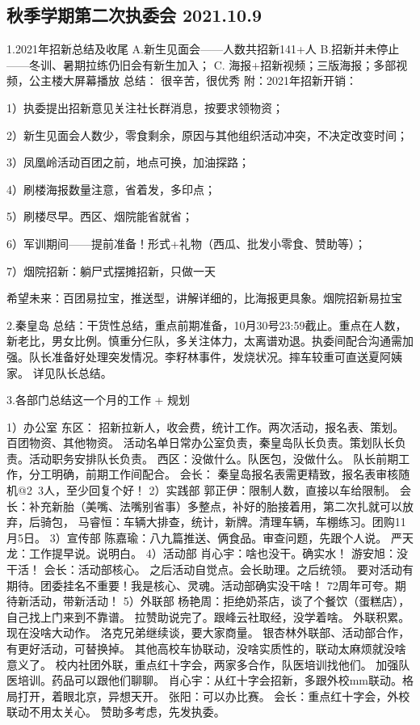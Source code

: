 \documentclass{ctexbook}
\begin{document}
\subsection{秋季学期第二次执委会 2021.10.9}
1.2021年招新总结及收尾 A.新生见面会——人数共招新141+人 B.招新并未停止——冬训、暑期拉练仍旧会有新生加入； C. 海报+招新视频；三版海报；多部视频，公主楼大屏幕播放 总结： 很辛苦，很优秀 附：2021年招新开销： 

1）执委提出招新意见关注社长群消息，按要求领物资；

2）新生见面会人数少，零食剩余，原因与其他组织活动冲突，不决定改变时间；

3）凤凰岭活动百团之前，地点可换，加油探路；

4）刷楼海报数量注意，省着发，多印点；

5）刷楼尽早。西区、烟院能省就省；

6）军训期间——提前准备！形式+礼物（西瓜、批发小零食、赞助等）；

7）烟院招新：躺尸式摆摊招新，只做一天

希望未来：百团易拉宝，推送型，讲解详细的，比海报更具象。烟院招新易拉宝 

2.秦皇岛 总结：干货性总结，重点前期准备，10月30号23:59截止。重点在人数，新老比，男女比例。慎重分仨队，多关注体力，太离谱劝退。执委间配合沟通需加强。队长准备好处理突发情况。李籽林事件，发烧状况。摔车较重可直送夏阿姨家。 详见队长总结。

3.各部门总结这一个月的工作 + 规划 

1）办公室 东区： 招新拉新人，收会费，统计工作。两次活动，报名表、策划。百团物资、其他物资。
活动名单日常办公室负责，秦皇岛队长负责。策划队长负责。活动职务安排队长负责。 
西区：没做什么。队医包，没做什么。
队长前期工作，分工明确，前期工作间配合。 
会长： 秦皇岛报名表需更精致，报名表审核随机@2~3人，至少回复个好！ 
2）实践部 郭正伊：限制人数，直接以车给限制。 
会长：补充新胎（美嘴、法嘴别省事）多整点，补好的胎接着用，第二次扎就可以放弃，后骑包，
马睿恒：车辆大排查，统计，新牌。清理车辆，车棚练习。团购11月5日。 
3）宣传部 陈嘉瑜：八九篇推送、俩食品。审查问题，先跟个人说。 
严天龙：工作提早说。说明白。 
4）活动部 肖心宇：啥也没干。确实水！  
游安旭：没干活！ 
会长：活动部核心。
之后活动自觉点。会长助理。之后统领。
要对活动有期待。团委挂名不重要！我是核心、灵魂。活动部确实没干啥！
72周年可夸。期待新活动，带新活动！ 
5）外联部 杨艳周：拒绝奶茶店，谈了个餐饮（蛋糕店），自己找上门来到不靠谱。
拉赞助说完了。跟峰云社取经，没学着啥。
外联积累。现在没啥大动作。
洛克兄弟继续谈，要大家商量。 
银杏林外联部、活动部合作，有更好活动，可替换掉。
其他高校车协联动，没啥实质性的，联动太麻烦就没啥意义了。 
校内社团外联，重点红十字会，两家多合作，队医培训找他们。
加强队医培训。药品可以跟他们聊聊。 
肖心宇：从红十字会招新，多跟外校mm联动。格局打开，着眼北京，异想天开。 
张阳：可以办比赛。 
会长：重点红十字会，外校联动不用太关心。
赞助多考虑，先发执委。 
\end{document}
